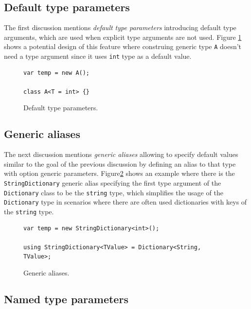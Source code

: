 \subsection{Default type parameters}

The first discussion \cite{online:DefTypeParam} mentions \textit{default type parameters} introducing default type arguments, which are used when explicit type arguments are not used. 
Figure \ref{img19:defTypeParam} shows a potential design of this feature where construing generic type \texttt{A} doesn’t need a type argument since it uses \texttt{int} type as a default value. 
\begin{figure}[h]
\begin{lstlisting}[style=csharp]
var temp = new A();

class A<T = int> {}
\end{lstlisting}
\caption{Default type parameters.}
\label{img19:defTypeParam}
\end{figure}

\subsection{Generic aliases}

The next discussion \cite{online:GenAlias} mentions \textit{generic aliases} allowing to specify default values similar to the goal of the previous discussion by defining an alias to that type with option generic parameters. 
Figure\ref{img20:genAlias} shows an example where there is the \texttt{StringDictionary} generic alias specifying the first type argument of the \texttt{Dictionary} class to be the \texttt{string} type, which simplifies the usage of the \texttt{Dictionary} type in scenarios where there are often used dictionaries with keys of the \texttt{string} type.
\begin{figure}[h]
\begin{lstlisting}[style=csharp]
var temp = new StringDictionary<int>();

using StringDictionary<TValue> = Dictionary<String, TValue>;
\end{lstlisting}
\caption{Generic aliases.}
\label{img20:genAlias}
\end{figure}

\subsection{Named type parameters}

